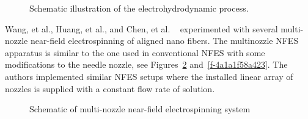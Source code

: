 \documentclass[5p,,preprint,12pt,twocolumn]{elsarticle}
\makeatletter
\def\fixFloatSize#1{}%
\makeatother
\begin{document}
\bgroup
\fixFloatSize{images/fa274bb7-a79d-48ae-9349-953df62c0094-ugupta_00.png}
\begin{figure}[!htbp]
\centering \makeatletter{}
\makeatother 
\caption{{Schematic illustration of the electrohydrodynamic process. \unskip~\protect\cite{527120:11974310}}}
\label{f-74de1f00848b}
\end{figure}
\egroup
Wang, et al., Huang, et al., and Chen, et al. \unskip~\cite{527120:11974322,527120:11974323,527120:11974324} experimented with several multi-nozzle near-field electrospinning of aligned nano fibers. The multinozzle NFES apparatus is similar to the one used in conventional NFES with some modifications to the needle nozzle, see Figures~\ref{f-96ee25855dea} and~\ref{f-4a1a1f58a423}. The authors implemented similar NFES setups where the installed linear array of nozzles is supplied with a constant flow rate of solution.


\bgroup
\fixFloatSize{images/add2f32e-eac8-460d-a7ff-3d0a7b07c15f-uwang_00.png}
\begin{figure}[!htbp]
\centering \makeatletter{}
\makeatother 
\caption{{Schematic of multi-nozzle near-field electrospinning system \unskip~\protect\cite{527120:11974323}}}
\label{f-96ee25855dea}
\end{figure}
\egroup
\end{document}
